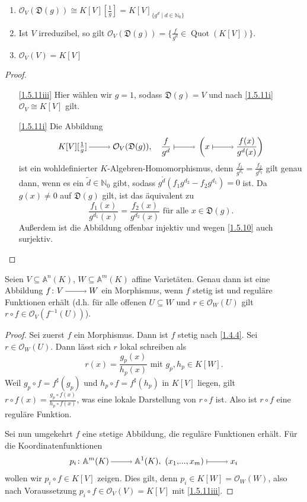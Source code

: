 \documentclass[a4paper,12pt]{scrbook}
\theoremstyle{keinenummern} %
\theoremstyle{mitnummern}
\theoremstyle{unserbeweis}
\newtheorem{proof}{Beweis}
\def\A{\mathbb{A}}
\def\O{\mathcal{O}}
\newcommand{\D}{\mathfrak{D}}
\newcommand{\Quot}{\operatorname{Quot}}
\renewcommand{\dotsc}{\ensuremath{\!...}}
\newcommand{\set}[1]{\ensuremath{\mathbb{#1}}}
\newcommand{\N}{\set{N}}
\newcommand{\ra}{\raisebox{-1pt}{\tikz{\draw[thin,shorten >=3pt, ->] (0,0) node{\hspace*{-2pt}} -- node{} (1,0);}}\penalty1000\relax}
\renewcommand{\mapsto}{\raisebox{-1pt}{\tikz{\draw[thin,shorten >=3pt, |->] (0,0) node{\hspace*{0pt}} -- node{} (1,0);}}\penalty1000\relax}
\begin{document}
\begin{kor}\label{1.5.11}
  \begin{enumerate}
  \item{} $\O_V(\D(g))\cong K[V][\frac1g] = K[V]_{\{g^d\mid d\in\N_0\}}$
  \item{} Ist $V$ irreduzibel, so gilt $\O_V(\D(g))=\{\frac{f}{g^d}\in\Quot(K[V])\}$.
  \item{} $\O_V(V)=K[V]$
  \end{enumerate}
\end{kor}
\begin{proof}
  \begin{enumerate}
  \item[\ref{1.5.11iii}] Hier wählen wir $g=1$, sodass $\D(g)=V$ und nach \ref{1.5.11i} $\O_V\cong K[V]$ gilt.
  \item[\ref{1.5.11i}] Die Abbildung
    \[K[V][\textstyle\frac1g]\ra\O_V(\D(g)),\quad \displaystyle\frac{f}{g^d}\mapsto\left(x\mapsto\frac{f(x)}{g^d(x)}\right) \]
    ist ein wohldefinierter $K$-Algebren-Homomorphismus, denn $\frac{f_1}{g^{d_1}}=\frac{f_2}{g^{d_2}}$ gilt genau dann, wenn es
    ein $\tilde{d}\in\N_0$ gibt, sodass $g^{\tilde{d}}(f_1g^{d_2}-f_2g^{d_1})=0$ ist. Da $g(x)\neq0$ auf $\D(g)$ gilt, ist das
    äquivalent zu \[\frac{f_1(x)}{g^{d_1}(x)}=\frac{f_2(x)}{g^{d_2}(x)}\text{ für alle }x\in \D(g).\] Außerdem ist die Abbildung
    offenbar injektiv und wegen \cref{1.5.10} auch surjektiv.
  \end{enumerate}
\end{proof}

\begin{prop}\label{1.5.12}
  Seien $V\subseteq\A^n(K)$, $W\subseteq\A^m(K)$ affine Varietäten. Genau dann ist eine Abbildung $f\colon V\ra W$ ein
  Morphismus, wenn $f$ stetig ist und reguläre Funktionen erhält (d.h. für alle offenen $U\subseteq W$ und $r\in\O_W(U)$ gilt
  $r\circ f\in\O_V(f^{-1}(U))$).
\end{prop}
\begin{proof}
  Sei zuerst $f$ ein Morphismus. Dann ist $f$ stetig nach \cref{1.4.4}. Sei $r\in\O_W(U)$. Dann lässt sich $r$ lokal
  schreiben als \[r(x)=\frac{g_p(x)}{h_p(x)}\text{ mit }g_p,h_p\in K[W].\] Weil $g_p\circ f=f^\sharp(g_p)$ und $h_p\circ
  f=f^\sharp(h_p)$ in $K[V]$ liegen, gilt $r\circ f(x)=\frac{g_p\circ f(x)}{h_p\circ f(x)}$, was eine lokale Darstellung von
  $r\circ f$ ist. Also ist $r\circ f$ eine reguläre Funktion.

  Sei nun umgekehrt $f$ eine stetige Abbildung, die reguläre Funktionen erhält. Für die Koordinatenfunktionen \[p_i\colon
  \A^m(K)\ra \A^1(K),\ (x_1,\dotsc,x_m)\mapsto x_i\] wollen wir $p_i\circ f\in K[V]$ zeigen. Dies gilt, denn $p_i\in K[W] =
  \O_W(W)$, also nach Voraussetzung $p_i\circ f\in\O_V(V)=K[V]$ mit \cref{1.5.11iii}.
\end{proof}
\end{document}

